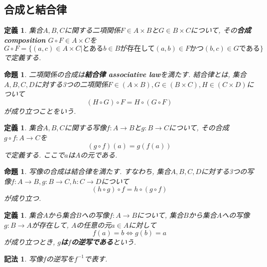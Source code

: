 \documentclass[dvipdfmx]{jsbook}
\theoremstyle{plain}
\newtheorem{Def}[thm]{定義}
\newtheorem{Notation}[thm]{記法}
\newtheorem{Prop}[thm]{命題}
\begin{document}
\subsection{合成と結合律}
\begin{Def}
集合$A,B,C$に関する二項関係$F\in A\times B$と$G\in B\times C$について, その{\bf 合成 composition} $G\circ F\in A\times C$を
\[
G\circ F=\{(a,c)\in A\times C|\text{とある}b\in B\text{が存在して}(a,b)\in F \text{かつ} (b,c)\in G\text{である}\}
\]
で定義する.
\end{Def}
\begin{Prop}
二項関係の合成は{\bf 結合律 associative law}を満たす.
結合律とは, 集合$A,B,C,D$に対する3つの二項関係$F\in(A\times B),G\in(B\times C),H\in(C\times D)$について
\[
(H\circ G)\circ F=H\circ (G\circ F)
\]
が成り立つことをいう.
\end{Prop}

\begin{Def}
集合$A,B,C$に関する写像$f:A\rightarrow B$と$g:B\rightarrow C$について, その合成 $g\circ f:A\rightarrow C$を
\[
(g\circ f)(a)=g(f(a))
\]
で定義する. ここで$a$は$A$の元である.
\end{Def}
\begin{Prop}
写像の合成は結合律を満たす.
すなわち, 集合$A,B,C,D$に対する3つの写像$f:A\rightarrow B, g:B\rightarrow C,
h:C\rightarrow D$について
\[
(h\circ g)\circ f=h\circ(g\circ f)
\]
が成り立つ.
\end{Prop}

\begin{Def}
集合$A$から集合$B$への写像$f:A\rightarrow B$について, 集合$B$から集合$A$への写像$g:B\rightarrow A$が存在して, $A$の任意の元$a\in A$に対して
\[
f(a)=b \Leftrightarrow g(b)=a
\]
が成り立つとき, {\bf $g$は$f$の逆写である}という.
\end{Def}
\begin{Notation}
写像$f$の逆写を$f^{-1}$で表す.
\end{Notation}

\begin{comment}
************************************
\begin{Def}
部分関数の合成
\end{Def}

\begin{Prop}
部分関数の合成は結合律を満たす.
\end{Prop}
************************************
\end{comment}

\begin{comment}
************************************
\section{族}
\begin{Def}
集合$I$ 
から集合$X$への写像$f:I\rightarrow X$が存在するとき, 集合$\{x_i\in X\mid x_i=f(i), i\in I\}$のことを
{\bf $I$を添字集合 index set とする$X$の元の族}という.
\end{Def}
************************************
\end{comment}
\end{document}
